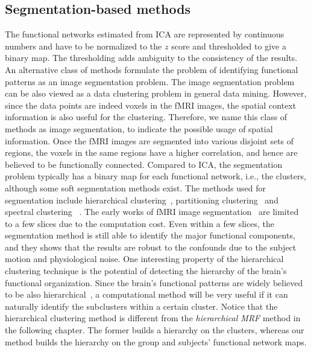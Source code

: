 \subsection{Segmentation-based methods}
The functional networks estimated from ICA are represented by continuous numbers
and have to be normalized to the $z$ score and thresholded to give a binary
map. The thresholding adds ambiguity to the consistency of the results. An
alternative class of methods formulate the problem of identifying functional
patterns as an image segmentation problem. The image segmentation problem can be
also viewed as a data clustering problem in general data mining. However, since
the data points are indeed voxels in the fMRI images, the spatial context
information is also useful for the clustering. Therefore, we name this class of
methods as image segmentation, to indicate the possible usage of spatial
information. Once the fMRI images are segmented into various disjoint sets of
regions, the voxels in the same regions have a higher correlation, and hence are
believed to be functionally connected. Compared to ICA, the segmentation problem
typically has a binary map for each functional network, i.e., the clusters,
although some soft segmentation methods exist. The methods used for segmentation
include hierarchical clustering~\cite{salvador2005neurophysiological,
  cohen2008defining, cordes2002hierarchical, bellec2010multi}, partitioning
clustering~\cite{bellec2010multi} and spectral clustering
~\cite{van2008normalized, craddock2012whole}. The early works of fMRI image
segmentation~\cite{cordes2002hierarchical} are limited to a few slices due to
the computation cost. Even within a few slices, the segmentation method is still
able to identify the major functional components, and they shows that the
results are robust to the confounds due to the subject motion and physiological
noise. One interesting property of the hierarchical clustering technique is the
potential of detecting the hierarchy of the brain's functional
organization. Since the brain's functional patterns are widely believed to be
also hierarchical~\cite{yeo2011organization}, a computational method will be
very useful if it can naturally identify the subclusters within a certain
cluster. Notice that the hierarchical clustering method is different from the
\emph{hierarchical MRF} method in the following chapter. The former builds a
hierarchy on the clusters, whereas our method builds the hierarchy on the group
and subjects' functional network maps.

